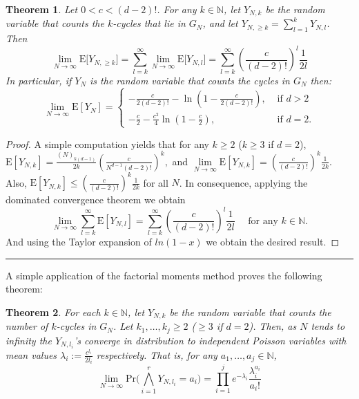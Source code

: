 \documentclass[11pt,notitlepage,a4paper]{article}
\newtheorem{theorem}{Theorem}[section]
\theoremstyle{definition}
\newcommand{\N}{\mathbb{N}}
\newcommand{\LN}{\lim\limits_{N\to \infty}}
\begin{document}
	\begin{theorem} \label{thm:expectedcycles}
		Let $0< c< (d-2)!$. For any $k\in \N$, 
		let $Y_{N,k}$ be the random
		variable that counts
		the $k$-cycles that lie in $G_N$,
		and let $Y_{N,\geq k}= \sum_{l=1}^k Y_{N,l}$.
		Then
		\[
		\LN \mathrm{E}\big[Y_{N,\geq k}\big]=
		\sum_{l=k}^{\infty} \LN \mathrm{E}
		\big[Y_{N,l}\big]=
		\sum_{l=k}^{\infty} 
		\left(\frac{c}{(d-2)!}\right)^l \frac{1}{2l}
		\] 	
		In particular, if $Y_N$ is the random variable that counts the cycles
		in $G_N$ then:
		\[
		\LN \mathrm{E}[Y_{N}]	= 
		\begin{cases}
		-\frac{c}{2(d-2)!}- \ln\left(1-\frac{c}{2(d-2)!}\right), &  
		\text{ if } d>2\\
		-\frac{c}{2}- \frac{c^2}{4} 
		\ln\left(1-\frac{c}{2}\right), &
		\text{ if } d=2.
		\end{cases}
		\]
	\end{theorem}
	\begin{proof}
	
		A simple computation yields that for 
		any $k\geq 2$ ($k\geq 3$ if $d=2$),
		$
		\mathrm{E}[Y_{N,k}]= 
		\frac{(N)_{k(d-1)}}{2k}
		\left(\frac{c}{N^{d-1}(d-2)!}\right)^k,$
		and
		$
		\LN	\mathrm{E}[Y_{N,k}]= 
		\left(\frac{c}{(d-2)!}\right)^k \frac{1}{2k}
		$.
		Also,
		$
		\mathrm{E}[Y_{N,k}]\leq \left(\frac{c}{(d-2)!}\right)^k \frac{1}{2k}$
		for all $N$. In consequence, applying the dominated convergence
		theorem we obtain
		\[ 
		\LN \sum_{l=k}^\infty \mathrm{E}[Y_{N,l}]=
		 \sum_{l=k}^\infty \left(\frac{c}{(d-2)!}\right)^l \frac{1}{2l} \quad 
		 \text{ for any } k\in \N.
		\]
		And using the Taylor expansion of $ln(1-x)$ we obtain
		the desired	result. 
	\end{proof}
	\noindent\rule{2cm}{0.4pt}\par

	
	
	A simple application of the factorial moments method proves the following
	theorem:
	\begin{theorem} \label{thm:probcycles} 
		For each $k\in \N$, let $Y_{N,k}$ be the random variable
		that counts the number of $k$-cycles in $G_N$.
		Let $k_1,\dots,k_j\geq 2$ ($\geq 3$ if $d=2$). Then, 
		as $N$ tends to infinity the $Y_{N,l_i}$'s converge 
		in distribution to independent Poisson variables
		with mean values $\lambda_i:=\frac{c^{l_i}}{2l_i}$ respectively.
		That is, for any $a_1,\dots,a_j\in \N$,
		\[
		\LN \mathrm{Pr}\Big(
		\bigwedge_{i=1}^r
		Y_{N,l_i}=a_i		
		\Big)= \prod_{i=1}^{j} e^{-\lambda_i}\frac{\lambda_i^{a_i}}{a_i!}
		\]
	\end{theorem}
		
\end{document}

